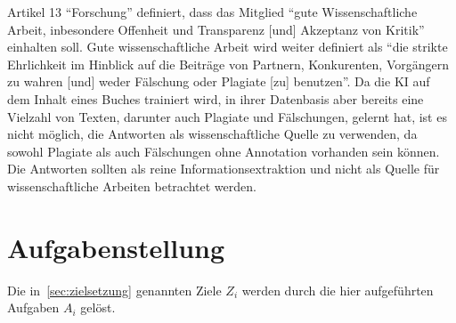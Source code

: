 Artikel 13 \enquote{Forschung} definiert, dass das Mitglied \enquote{gute Wissenschaftliche Arbeit, inbesondere Offenheit und Transparenz [und] Akzeptanz von Kritik}
einhalten soll. 
Gute wissenschaftliche Arbeit wird weiter definiert als 
\enquote{die strikte Ehrlichkeit im Hinblick auf die Beiträge von Partnern, Konkurenten, Vorgängern zu wahren [und] weder Fälschung oder Plagiate [zu] benutzen}.
Da die KI auf dem Inhalt eines Buches trainiert wird, in ihrer Datenbasis aber bereits eine Vielzahl von Texten, darunter auch Plagiate und Fälschungen, gelernt hat, 
ist es nicht möglich, die Antworten als wissenschaftliche Quelle zu verwenden, da sowohl Plagiate als auch Fälschungen ohne Annotation vorhanden sein können.
Die Antworten sollten als reine Informationsextraktion und nicht als Quelle für wissenschaftliche Arbeiten betrachtet werden.

\section{Aufgabenstellung}

Die in~\ref{sec:zielsetzung} genannten Ziele $Z_i$ werden durch die hier aufgeführten Aufgaben $A_i$ gelöst.

